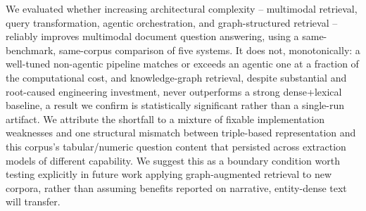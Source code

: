 \documentclass[sigconf,anonymous,review]{acmart}
\begin{document}
We evaluated whether increasing architectural complexity -- multimodal retrieval, query transformation, agentic orchestration, and graph-structured retrieval -- reliably improves multimodal document question answering, using a same-benchmark, same-corpus comparison of five systems. It does not, monotonically: a well-tuned non-agentic pipeline matches or exceeds an agentic one at a fraction of the computational cost, and knowledge-graph retrieval, despite substantial and root-caused engineering investment, never outperforms a strong dense+lexical baseline, a result we confirm is statistically significant rather than a single-run artifact. We attribute the shortfall to a mixture of fixable implementation weaknesses and one structural mismatch between triple-based representation and this corpus's tabular/numeric question content that persisted across extraction models of different capability. We suggest this as a boundary condition worth testing explicitly in future work applying graph-augmented retrieval to new corpora, rather than assuming benefits reported on narrative, entity-dense text will transfer.



\end{document}
